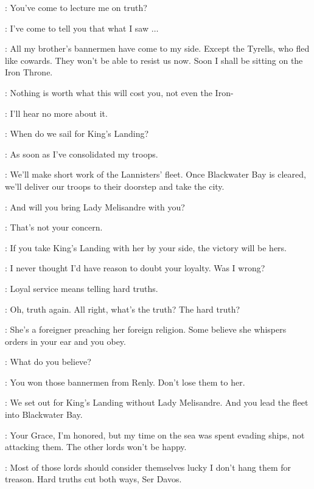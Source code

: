 \STANNIS: You've come to lecture me on truth? 

\DAVOS: I've come to tell you that what I saw $\ldots$  

\STANNIS: All my brother's bannermen have come to my side. Except the Tyrells, who fled like cowards. They won't be able to resist us now. Soon I shall be sitting on the Iron Throne. 

\DAVOS: Nothing is worth what this will cost you, not even the Iron- 

\STANNIS: I'll hear no more about it. 


\STANNIS: When do we sail for King's Landing? 

\DAVOS: As soon as I've consolidated my troops. 

\STANNIS: We'll make short work of the Lannisters' fleet. Once Blackwater Bay is cleared, we'll deliver our troops to their doorstep and take the city. 

\DAVOS: And will you bring Lady Melisandre with you? 

\STANNIS: That's not your concern. 

\DAVOS: If you take King's Landing with her by your side, the victory will be hers. 

\STANNIS: I never thought I'd have reason to doubt your loyalty. Was I wrong? 

\DAVOS: Loyal service means telling hard truths. 

\STANNIS: Oh, truth again. All right, what's the truth? The hard truth? 

\DAVOS: She's a foreigner preaching her foreign religion. Some believe she whispers orders in your ear and you obey. 

\STANNIS: What do you believe? 

\DAVOS: You won those bannermen from Renly. Don't lose them to her. 

\STANNIS: We set out for King's Landing without Lady Melisandre. And you lead the fleet into Blackwater Bay. 

\DAVOS: Your Grace, I'm honored, but my time on the sea was spent evading ships, not attacking them. The other lords won't be happy. 

\STANNIS: Most of those lords should consider themselves lucky I don't hang them for treason. Hard truths cut both ways, Ser Davos. 



